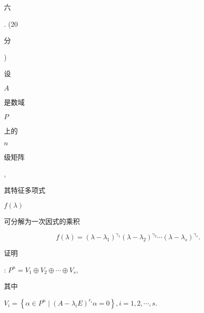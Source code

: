 \documentclass[10pt]{article}
\begin{document}
\begin{CJK}{UTF8}{mj}六\end{CJK}. (20 \begin{CJK}{UTF8}{mj}分\end{CJK}) \begin{CJK}{UTF8}{mj}设\end{CJK} $A$ \begin{CJK}{UTF8}{mj}是数域\end{CJK} $P$ \begin{CJK}{UTF8}{mj}上的\end{CJK} $n$ \begin{CJK}{UTF8}{mj}级矩阵\end{CJK}, \begin{CJK}{UTF8}{mj}其特征多项式\end{CJK} $f(\lambda)$ \begin{CJK}{UTF8}{mj}可分解为一次因式的乘积\end{CJK}
$$
f(\lambda)=\left(\lambda-\lambda_{1}\right)^{\gamma_{1}}\left(\lambda-\lambda_{2}\right)^{\gamma_{2}} \cdots\left(\lambda-\lambda_{s}\right)^{\gamma_{s}} .
$$
\begin{CJK}{UTF8}{mj}证明\end{CJK}: $P^{n}=V_{1} \oplus V_{2} \oplus \cdots \oplus V_{s}$, \begin{CJK}{UTF8}{mj}其中\end{CJK} $V_{i}=\left\{\alpha \in P^{n} \mid\left(A-\lambda_{i} E\right)^{r_{i}} \alpha=0\right\}, i=1,2, \cdots, s$.
\end{document}
